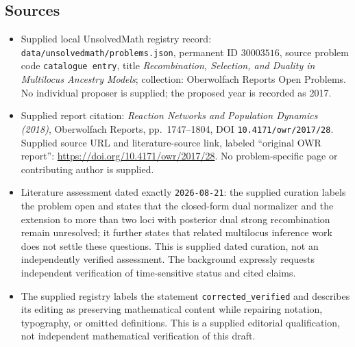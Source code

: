\documentclass[11pt]{article}
\begin{document}
\subsection{Sources}
\begin{itemize}
\item Supplied local UnsolvedMath registry record: \texttt{data/unsolvedmath/problems.json}, permanent ID \(30003516\), source problem code \texttt{catalogue entry}, title \emph{Recombination, Selection, and Duality in Multilocus Ancestry Models}; collection: Oberwolfach Reports Open Problems. No individual proposer is supplied; the proposed year is recorded as 2017.
\item Supplied report citation: \emph{Reaction Networks and Population Dynamics (2018)}, Oberwolfach Reports, pp.\ 1747--1804, DOI \texttt{10.4171/owr/2017/28}. Supplied source URL and literature-source link, labeled ``original OWR report'': \url{https://doi.org/10.4171/owr/2017/28}. No problem-specific page or contributing author is supplied.
\item Literature assessment dated exactly \texttt{2026-08-21}: the supplied curation labels the problem open and states that the closed-form dual normalizer and the extension to more than two loci with posterior dual strong recombination remain unresolved; it further states that related multilocus inference work does not settle these questions. This is supplied dated curation, not an independently verified assessment. The background expressly requests independent verification of time-sensitive status and cited claims.
\item The supplied registry labels the statement \texttt{corrected\_verified} and describes its editing as preserving mathematical content while repairing notation, typography, or omitted definitions. This is a supplied editorial qualification, not independent mathematical verification of this draft.
\end{itemize}
\end{document}
